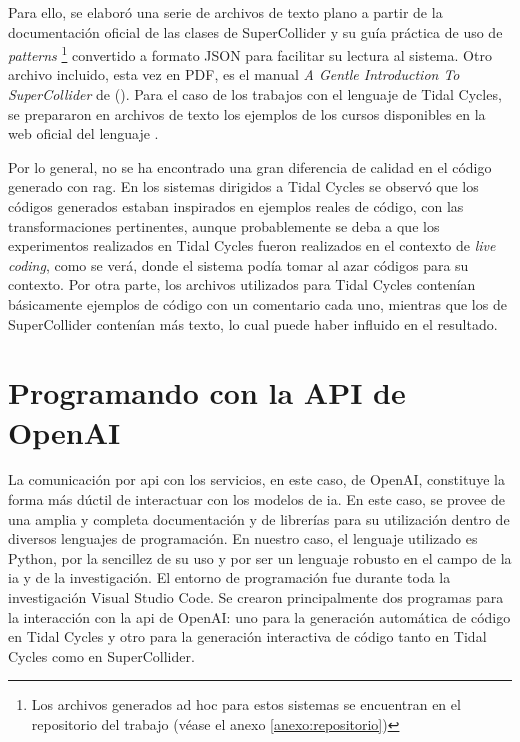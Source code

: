 Para ello, se elaboró una serie de archivos de texto plano a partir de la documentación oficial de las clases de SuperCollider y su guía práctica de uso de \emph{patterns} \citep{SuperCollider12Help}\footnote{Los archivos generados ad hoc para estos sistemas se encuentran en el repositorio del trabajo (véase el anexo \ref{anexo:repositorio})} convertido a formato JSON para facilitar su lectura al sistema. Otro archivo incluido, esta vez en PDF, es el manual \emph{A Gentle Introduction To SuperCollider} de \citeauthor{ruviaroGentleIntroductionSuperCollider2015} (\citeyear{ruviaroGentleIntroductionSuperCollider2015}). Para el caso de los trabajos con el lenguaje de Tidal Cycles, se prepararon en archivos de texto los ejemplos de los cursos disponibles en la web oficial del lenguaje \citep{TidalCycles}.

Por lo general, no se ha encontrado una gran diferencia de calidad en el código generado con \gls{rag}. En los sistemas dirigidos a Tidal Cycles se observó que los códigos generados estaban inspirados en ejemplos reales de código, con las transformaciones pertinentes, aunque probablemente se deba a que los experimentos realizados en Tidal Cycles fueron realizados en el contexto de \emph{live coding}, como se verá, donde el sistema podía tomar al azar códigos para su contexto. Por otra parte, los archivos utilizados para Tidal Cycles contenían básicamente ejemplos de código con un comentario cada uno, mientras que los de SuperCollider contenían más texto, lo cual puede haber influido en el resultado.


\section{Programando con la API de OpenAI}

La comunicación por \gls{api} con los servicios, en este caso, de OpenAI, constituye la forma más dúctil de interactuar con los modelos de \gls{ia}. En este caso, se provee de una amplia y completa documentación y de librerías para su utilización dentro de diversos lenguajes de programación. En nuestro caso, el lenguaje utilizado es Python, por la sencillez de su uso y por ser un lenguaje robusto en el campo de la \gls{ia} y de la investigación. El entorno de programación fue durante toda la investigación Visual Studio Code. Se crearon principalmente dos programas para la interacción con la \gls{api} de OpenAI: uno para la generación automática de código en Tidal Cycles y otro para la generación interactiva de código tanto en Tidal Cycles como en SuperCollider.

